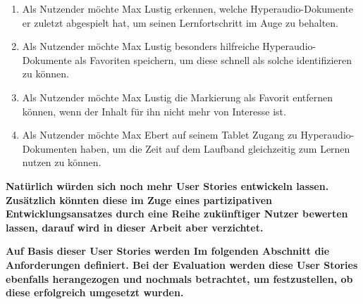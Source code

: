 \begin{enumerate}[label=US-\arabic*:,ref=US-\arabic*]
\item \label{US-Uebersicht-Letzte} Als Nutzender möchte Max Lustig erkennen, welche Hyperaudio-Dokumente er zuletzt abgespielt hat, um seinen Lernfortschritt im Auge zu behalten.

\item \label{US-Favoriten} Als Nutzender möchte Max Lustig besonders hilfreiche Hyperaudio-Dokumente als Favoriten speichern, um diese schnell als solche identifizieren zu können.

\item \label{US-Favoriten-Loeschen} Als Nutzender möchte Max Lustig die Markierung als Favorit entfernen können, wenn der Inhalt für ihn nicht mehr von Interesse ist.

\item \label{US-Zeit-Mobil} Als Nutzender möchte Max Ebert auf seinem Tablet Zugang zu Hyperaudio-Dokumenten haben, um die Zeit auf dem Laufband gleichzeitig zum Lernen nutzen zu können.

\end{enumerate}
\textbf{
Natürlich würden sich noch mehr User Stories entwickeln lassen. Zusätzlich könnten diese im Zuge eines partizipativen Entwicklungsansatzes durch eine Reihe zukünftiger Nutzer bewerten lassen, darauf wird in dieser Arbeit aber verzichtet.}

\textbf{Auf Basis dieser User Stories werden Im folgenden Abschnitt die Anforderungen definiert. Bei der Evaluation werden diese User Stories ebenfalls herangezogen und nochmals betrachtet, um festzustellen, ob diese erfolgreich umgesetzt wurden.}

%
%
%
%


